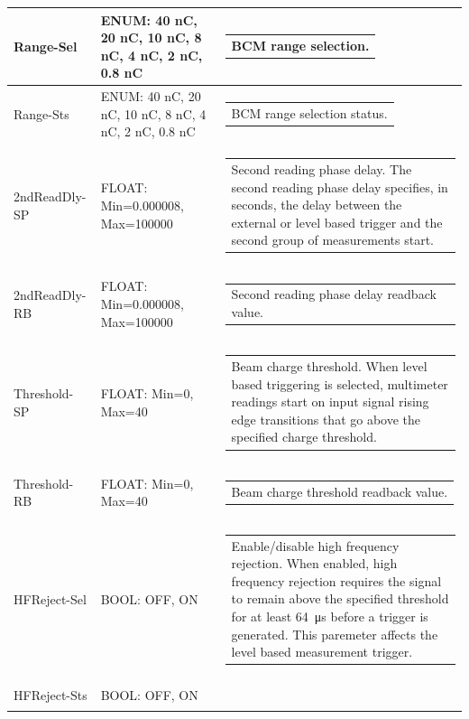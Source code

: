 \documentclass[openany]{article}
\begin{document}
\begin{longtable}{| m{3.0cm} m{4.5cm} m{7.0cm} |}
		Range-Sel & ENUM: 40 nC, 20 nC, 10 nC, 8 nC, 4 nC, 2 nC, 0.8 nC & \begin{tabular}{@{}m{6cm}@{}}
	    					BCM range selection.
						\end{tabular} \\ \hline
		Range-Sts & ENUM: 40 nC, 20 nC, 10 nC, 8 nC, 4 nC, 2 nC, 0.8 nC & \begin{tabular}{@{}m{6cm}@{}}
	    					BCM range selection status.
						\end{tabular} \\ \hline
		2ndReadDly-SP & FLOAT: Min=0.000008, Max=100000 & \begin{tabular}{@{}m{6cm}@{}}
	    					Second reading phase delay. The second reading phase delay specifies, in seconds, the delay between the external or level based trigger and the second group of measurements start.
						\end{tabular} \\ \hline
		2ndReadDly-RB & FLOAT: Min=0.000008, Max=100000 & \begin{tabular}{@{}m{6cm}@{}}
	    					Second reading phase delay readback value.
						\end{tabular} \\ \hline
		Threshold-SP & FLOAT: Min=0, Max=40 & \begin{tabular}{@{}m{6cm}@{}}
	    					Beam charge threshold. When level based triggering is selected, multimeter readings start on input signal rising edge transitions that go above the specified charge threshold.
						\end{tabular} \\ \hline
		Threshold-RB & FLOAT: Min=0, Max=40 & \begin{tabular}{@{}m{6cm}@{}}
	    					Beam charge threshold readback value.
						\end{tabular} \\ \hline
		HFReject-Sel & BOOL: OFF, ON & \begin{tabular}{@{}m{6cm}@{}}
	    					Enable/disable high frequency rejection. When enabled, high frequency rejection requires the signal to remain above the specified threshold for at least \SI{64}{\micro\second} before a trigger is generated. This paremeter affects the level based measurement trigger.
						\end{tabular} \\ \hline
		HFReject-Sts & BOOL: OFF, ON & \begin{tabular}{@{}m{6cm}@{}}

\end{tabular}
\end{longtable}
\end{document}
